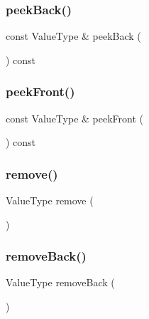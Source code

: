 \mbox{\label{classDeque_a617bbcedcfbc36e19f4aa806074da07e}} 
\subsubsection{\texorpdfstring{peek\+Back()}{peekBack()}}
{\footnotesize\ttfamily const Value\+Type \& peek\+Back (\begin{DoxyParamCaption}{ }\end{DoxyParamCaption}) const}

\mbox{\label{classDeque_a7bac5f26f5665291d89e8de29496ee79}} 
\subsubsection{\texorpdfstring{peek\+Front()}{peekFront()}}
{\footnotesize\ttfamily const Value\+Type \& peek\+Front (\begin{DoxyParamCaption}{ }\end{DoxyParamCaption}) const}

\mbox{\label{classDeque_a025ec97fa5b04552f5ad0902c1f02ac1}} 
\subsubsection{\texorpdfstring{remove()}{remove()}}
{\footnotesize\ttfamily Value\+Type remove (\begin{DoxyParamCaption}{ }\end{DoxyParamCaption})}

\mbox{\label{classDeque_af7878e9c2f67e06cbae525e9fa77e38e}} 
\subsubsection{\texorpdfstring{remove\+Back()}{removeBack()}}
{\footnotesize\ttfamily Value\+Type remove\+Back (\begin{DoxyParamCaption}{ }\end{DoxyParamCaption})}

